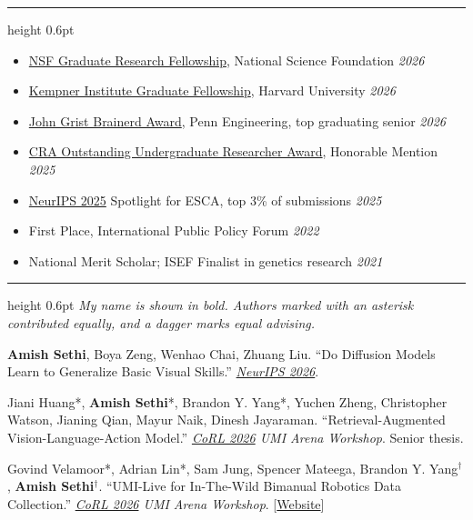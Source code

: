 \documentclass[letterpaper,11pt]{article}
\newenvironment{tight}{%
  \begin{itemize}\setlength{\itemsep}{0pt}\setlength{\parsep}{0pt}\setlength{\topsep}{1pt}}%
  {\end{itemize}}
\newcommand{\rsection}[1]{%
  \vspace{5pt}{\scshape\Large #1}\par\vspace{2pt}\hrule height 0.6pt\vspace{3pt}}
\newcommand{\linkhref}[2]{\textcolor{linkblue}{\href{#1}{#2}}}
\begin{document}
\rsection{Honors and Awards}
\begin{tight}
  \item \linkhref{https://www.nsf.gov/funding/opportunities/grfp-nsf-graduate-research-fellowship-program}{NSF Graduate Research Fellowship}, National Science Foundation \hfill \textit{\small 2026}
  \item \linkhref{https://kempnerinstitute.harvard.edu/education/graduate-fellowship/}{Kempner Institute Graduate Fellowship}, Harvard University \hfill \textit{\small 2026}
  \item \linkhref{https://academics.seas.upenn.edu/ugrad/awards/}{John Grist Brainerd Award}, Penn Engineering, top graduating senior \hfill \textit{\small 2026}
  \item \linkhref{https://cra.org/crae/awards/cra-outstanding-undergraduate-researchers/}{CRA Outstanding Undergraduate Researcher Award}, Honorable Mention \hfill \textit{\small 2025}
  \item \linkhref{https://neurips.cc/Conferences/2025}{NeurIPS 2025} Spotlight for ESCA, top 3\% of submissions \hfill \textit{\small 2025}
  \item First Place, International Public Policy Forum \hfill \textit{\small 2022}
  \item National Merit Scholar; ISEF Finalist in genetics research \hfill \textit{\small 2021}
\end{tight}

\rsection{Publications}
{\small\textit{My name is shown in bold. Authors marked with an asterisk contributed equally, and a dagger marks equal advising.}}
\vspace{3pt}

\textbf{Amish Sethi}, Boya Zeng, Wenhao Chai, Zhuang Liu. ``Do Diffusion Models Learn to Generalize Basic Visual Skills.'' \textit{\linkhref{https://neurips.cc/Conferences/2026}{NeurIPS 2026}}.

\vspace{3pt}
Jiani Huang*, \textbf{Amish Sethi}*, Brandon Y. Yang*, Yuchen Zheng, Christopher Watson, Jianing Qian, Mayur Naik, Dinesh Jayaraman. ``Retrieval-Augmented Vision-Language-Action Model.'' \textit{\linkhref{https://www.corl.org}{CoRL 2026} UMI Arena Workshop}. Senior thesis.

\vspace{3pt}
Govind Velamoor*, Adrian Lin*, Sam Jung, Spencer Mateega, Brandon Y. Yang$^\dagger$, \textbf{Amish Sethi}$^\dagger$. ``UMI-Live for In-The-Wild Bimanual Robotics Data Collection.'' \textit{\linkhref{https://www.corl.org}{CoRL 2026} UMI Arena Workshop}. \hfill [\linkhref{https://branyang02.github.io/umi-live/}{Website}]
\end{document}
